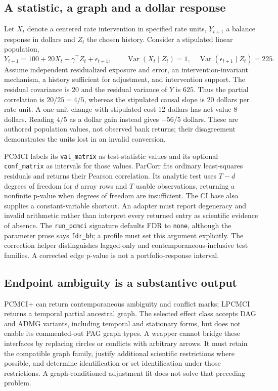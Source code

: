 \subsection{A statistic, a graph and a dollar response}
\label{exec23:tigramite-statistic}
Let $X_t$ denote a centered rate intervention in specified rate units, $Y_{t+1}$ a balance response in dollars and $Z_t$ the chosen history. Consider a stipulated linear population,
\begin{equation}
 Y_{t+1}=100+20X_t+\gamma^\top Z_t+\epsilon_{t+1},\qquad
 \operatorname{Var}(X_t\mid Z_t)=1,\quad
 \operatorname{Var}(\epsilon_{t+1}\mid Z_t)=225.
 \label{exec23:tigramite-dollar}
\end{equation}
Assume independent residualized exposure and error, an intervention-invariant mechanism, a history sufficient for adjustment, and intervention support. The residual covariance is $20$ and the residual variance of $Y$ is $625$. Thus the partial correlation is $20/25=4/5$, whereas the stipulated causal slope is 20 dollars per rate unit. A one-unit change with stipulated cost 12 dollars has net value 8 dollars. Reading $4/5$ as a dollar gain instead gives $-56/5$ dollars. These are authored population values, not observed bank returns; their disagreement demonstrates the units lost in an invalid conversion. \citep{exec23_tigramite_reference}

PCMCI labels its \texttt{val\_matrix} as test-statistic values and its optional \texttt{conf\_matrix} as intervals for those values. ParCorr fits ordinary least-squares residuals and returns their Pearson correlation. Its analytic test uses $T-d$ degrees of freedom for $d$ array rows and $T$ usable observations, returning a nonfinite p-value when degrees of freedom are insufficient. The CI base also supplies a constant-variable shortcut. An adapter must report degeneracy and invalid arithmetic rather than interpret every returned entry as scientific evidence of absence. The \texttt{run\_pcmci} signature defaults FDR to \texttt{none}, although the parameter prose says \texttt{fdr\_bh}; a profile must set this argument explicitly. The correction helper distinguishes lagged-only and contemporaneous-inclusive test families. A corrected edge p-value is not a portfolio-response interval. \citep{exec23_tigramite_reuse_source}

\subsection{Endpoint ambiguity is a substantive output}
\label{exec23:tigramite-graph}
PCMCI+ can return contemporaneous ambiguity and conflict marks; LPCMCI returns a temporal partial ancestral graph. The selected effect class accepts DAG and ADMG variants, including temporal and stationary forms, but does not enable its commented-out PAG graph types. A wrapper cannot bridge these interfaces by replacing circles or conflicts with arbitrary arrows. It must retain the compatible graph family, justify additional scientific restrictions where possible, and determine identification or set identification under those restrictions. A graph-conditioned adjustment fit does not solve that preceding problem. \citep{exec23_tigramite_reuse_source}

